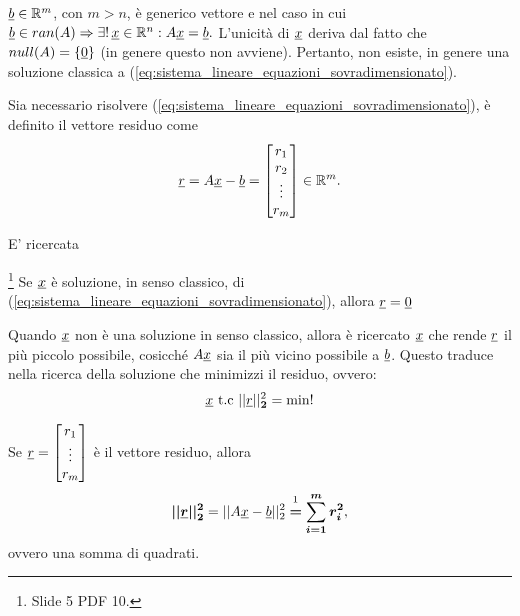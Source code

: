 $\uline b\in\mathbb R^m$, con $m>n$, è generico vettore e nel caso in cui $\uline b\in ran(A)\Rightarrow\exists! \,\uline x\in\mathbb R^n:A\uline x=\uline b.$ L'unicità di $\uline x$ deriva dal fatto che $null(A)=\{\uline 0\}$ (in genere questo non avviene). Pertanto, non esiste, in genere una soluzione classica a (\ref{eq:sistema_lineare_equazioni_sovradimensionato}).

\begin{definition}
	Sia necessario risolvere (\ref{eq:sistema_lineare_equazioni_sovradimensionato}), è definito il vettore residuo come
	\begin{equation}\label{eq:vettore_residuo}
		\uline r = A\uline x-\uline b=
		\begin{bmatrix}
			r_1\\
			r_2\\
			\vdots\\
			r_m
		\end{bmatrix}
		\in\mathbb R^m.
	\end{equation}
\end{definition}

E' ricercata 

\begin{remark}\footnote{Slide 5 PDF 10.}
    Se $\uline x$ è soluzione, in senso classico, di (\ref{eq:sistema_lineare_equazioni_sovradimensionato}), allora $\uline r=\uline 0$
\end{remark}

Quando $\uline x$ non è una soluzione in senso classico, allora è ricercato $\uline x$ che rende $\uline r$ il più piccolo possibile, cosicché $A\uline x$ sia il più vicino possibile a $\uline b$. Questo traduce nella ricerca della soluzione  che minimizzi il residuo, ovvero:
\begin{equation}\label{eq:norma_residuo}
    \uline x\text{ t.c }||\uline r||_{\boldsymbol 2}^2=\min!
\end{equation}
\begin{remark}
    Se $\uline r=\begin{bmatrix}
        r_1\\
        \vdots\\
        r_m
    \end{bmatrix}$ è il vettore residuo, allora
    \begin{equation}\label{eq:resNorm2}
        \boldsymbol{||\uline r||_2^2} = ||A\uline x - \uline b||_2^2 \overset{\footnotemark}{\boldsymbol =} \boldsymbol{\sum_{i=1}^m r_i^2},
    \end{equation}
    ovvero una somma di quadrati.
\end{remark}

